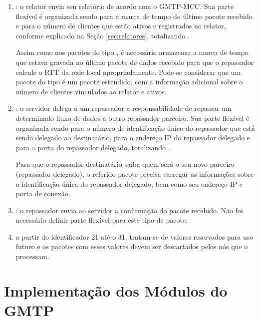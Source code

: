 \begin{enumerate}
	\setcounter{enumi}{+17}
	\item {}: o relator envia seu relatório de acordo com o GMTP-MCC. Sua parte flexível é organizada sendo  para a marca de tempo do último pacote  recebido e  para o número de clientes que estão ativos e registrados no relator, conforme explicado na Seção \ref{sec:relatores}, totalizando .
	
	Assim como nos pacotes do tipo , é necessário armazenar a marca de tempo que estava gravada no último pacote de dados recebido para que o repassador calcule o RTT da rede local apropriadamente. 
	Pode-se considerar que um pacote do tipo  é um pacote  estendido, com a informação adicional sobre o número de clientes vinculados ao relator e ativos.
	
	\item {}: o servidor delega a um repassador a responsabilidade de repassar um determinado fluxo de dados a outro repassador parceiro. Sua parte flexível é organizada sendo  para o número de identificação único do repassador que está sendo delegado ao destinatário,  para o endereço IP do repassador delegado e  para a porta do repassador delegado, totalizando .
	
	Para que o repassador destinatário saiba quem será o seu novo parceiro (repassador delegado), o referido pacote precisa carregar as informações sobre a identificação única do repassador delegado, bem como seu endereço IP e porta de conexão.
	
	\item {}: o repassador envia ao servidor a confirmação do pacote  recebido. Não foi necessário definir parte flexível para este tipo de pacote.
	
	\item {} a partir do identificador 21 até o 31, tratam-se de valores reservados para uso futuro e os pacotes com esses valores devem ser descartados pelos nós que o processam. 
\end{enumerate}

% 
% 
% 
%
\section{Implementação dos Módulos do GMTP}

